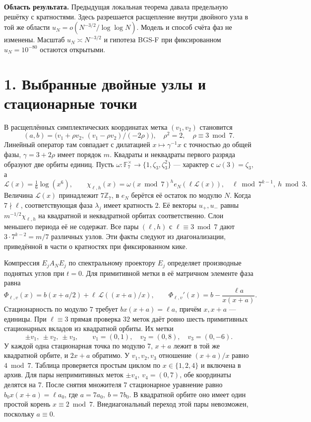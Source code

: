 \documentclass[11pt,a4paper]{article}
\newcommand{\sect}[1]{\section*{\sffamily\color{ink}#1}}
\newcommand{\subt}[1]{\par\medskip\noindent\textbf{#1.}\quad}
\newcommand{\Zp}{\mathbb Z_7}
\begin{document}
\subt{Область результата}
Предыдущая локальная теорема давала предельную решётку с кратностями. Здесь разрешается расщепление внутри двойного узла в той же области \(u_N=o(N^{-3/2}/\log\log N)\). Модель и способ счёта фаз не изменены. Масштаб \(u_N\asymp N^{-3/2}\) и гипотеза BGS-F при фиксированном \(u_N=10^{-80}\) остаются открытыми.
\newpage
\sect{1. Выбранные двойные узлы и стационарные точки}
В расщеплённых симплектических координатах метка \((v_1,v_2)\) становится
\[
     (a,b)=\bigl(v_1+\rho v_2,\,(v_1-\rho v_2)/(-2\rho)\bigr),
                \quad \rho^2=2,\quad \rho\equiv3\bmod7 .
\]
Линейный оператор там совпадает с дилатацией \(x\mapsto\gamma^{-1}x\) с точностью до общей фазы, \(\gamma=3+2\rho\) имеет порядок \(m\). Квадраты и неквадраты первого разряда образуют две орбиты единиц. Пусть \(\omega:\mathbb F_7^\times\to\{1,\zeta_3,\zeta_3^2\}\) --- характер с \(\omega(3)=\zeta_3\), а
\[
 \mathcal L(x)=\tfrac16\log(x^6),\qquad
 \chi_{\ell,h}(x)=\omega(x\bmod7)^h e_N(\ell\mathcal L(x)),
        \quad\ell\bmod7^{k-1},\ h\bmod3 .
\]
Величина \(\mathcal L(x)\) принадлежит \(7\Zp\), в \(e_N\) берётся её остаток по модулю \(N\). Когда \(7\nmid\ell\), соответствующая фаза \(\lambda_j\) имеет кратность \(2\). Её векторы \(u_+,u_-\) равны \(m^{-1/2}\chi_{\ell,h}\) на квадратной и неквадратной орбитах соответственно. Слои меньшего периода её не содержат. Все пары \((\ell,h)\) с \(\ell\equiv3\bmod7\) дают \(3\cdot7^{k-2}=m/7\) различных узлов. Эти факты следуют из диагонализации, приведённой в части о кратностях при фиксированном кике.

Компрессия \(E_j A_N E_j\) по спектральному проектору \(E_j\) определяет производные поднятых углов при \(t=0\). Для примитивной метки в её матричном элементе фаза равна
\[
 \Phi_{\ell,v}(x)=b(x+a/2)
        +\ell\,\mathcal L((x+a)/x),\qquad
 \Phi_{\ell,v}'(x)=b-\frac{\ell a}{x(x+a)} .
\]
Стационарность по модулю \(7\) требует \(b x(x+a)=\ell a\), причём \(x,x+a\) --- единицы. При \(\ell\equiv3\) прямая проверка \(32\) меток даёт ровно шесть примитивных стационарных вкладов из квадратной орбиты. Их метки
\[
               \pm v_1,\ \pm v_2,\ \pm v_3,\qquad
        v_1=(0,1),\quad v_2=(0,8),\quad v_3=(0,-6).
\]
У каждой одна стационарная точка по модулю \(7\), \(x+a\) лежит в той же квадратной орбите, и \(2x+a\) обратимо. У \(v_1,v_2,v_3\) отношение \((x+a)/x\) равно \(4\bmod7\). Таблица проверяется простым циклом по \(x\in\{1,2,4\}\) и включена в архив. Для пары непримитивных меток \(\pm v_4,\ v_4=(0,7)\), обе координаты делятся на \(7\). После снятия множителя \(7\) стационарное уравнение равно \(b_0 x(x+a)=\ell a_0\), где \(a=7a_0,\ b=7b_0\). В квадратной орбите оно имеет один простой корень \(x\equiv2\bmod7\). Внедиагональный переход этой пары невозможен, поскольку \(a\equiv0\).
\end{document}
